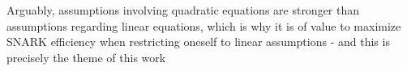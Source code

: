\documentclass[11pt]{article}
\numberwithin{figure}{section} %
\newcommand{\x}{\ensuremath{\mathbf{x}}\xspace}
\newcommand{\Y}{\ensuremath{\mathbf{Y}}\xspace}
\newcommand{\y}{\ensuremath{\mathbf{y}}\xspace}
\newcommand{\set}[1]{\ensuremath{\left\{#1\right\}}\xspace}
\begin{document}
Arguably, assumptions involving quadratic equations are stronger than assumptions regarding linear equations, which is why it is of value to maximize SNARK efficiency when restricting oneself to linear assumptions - and this is precisely the theme of this work
% 
% 
% 
% 
% 
% 
% 
% 
% 
% 
% 
% 
% 
\end{document}
